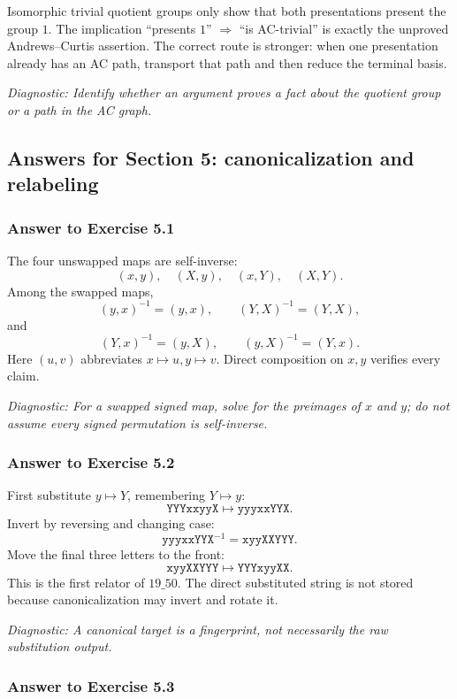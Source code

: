 \documentclass[11pt]{article}
\theoremstyle{definition}
\theoremstyle{remark}
\newcommand{\diagnostic}[1]{\par\smallskip\textit{Diagnostic: #1}}
\begin{document}
Isomorphic trivial quotient groups only show that both presentations
present the group \(1\).  The implication ``presents \(1\)'' \(\Rightarrow\)
``is AC-trivial'' is exactly the unproved Andrews--Curtis assertion.
The correct route is stronger: when one presentation already has an AC
path, transport that path and then reduce the terminal basis.

\diagnostic{Identify whether an argument proves a fact about the quotient
group or a path in the AC graph.}

\subsection*{Answers for Section 5: canonicalization and relabeling}

\subsubsection*{Answer to Exercise 5.1}

The four unswapped maps are self-inverse:
\[
(x,y),\quad(X,y),\quad(x,Y),\quad(X,Y).
\]
Among the swapped maps,
\[
(y,x)^{-1}=(y,x),\qquad
(Y,X)^{-1}=(Y,X),
\]
and
\[
(Y,x)^{-1}=(y,X),\qquad
(y,X)^{-1}=(Y,x).
\]
Here \((u,v)\) abbreviates \(x\mapsto u,y\mapsto v\).  Direct composition on
\(x,y\) verifies every claim.

\diagnostic{For a swapped signed map, solve for the preimages of \(x\) and
\(y\); do not assume every signed permutation is self-inverse.}

\subsubsection*{Answer to Exercise 5.2}

First substitute \(y\mapsto Y\), remembering \(Y\mapsto y\):
\[
\texttt{YYYxxyyX}\longmapsto\texttt{yyyxxYYX}.
\]
Invert by reversing and changing case:
\[
\texttt{yyyxxYYX}^{-1}=\texttt{xyyXXYYY}.
\]
Move the final three letters to the front:
\[
\texttt{xyyXXYYY}\longmapsto\texttt{YYYxyyXX}.
\]
This is the first relator of \(19\_50\).  The direct substituted string is
not stored because canonicalization may invert and rotate it.

\diagnostic{A canonical target is a fingerprint, not necessarily the raw
substitution output.}

\subsubsection*{Answer to Exercise 5.3}
\end{document}
